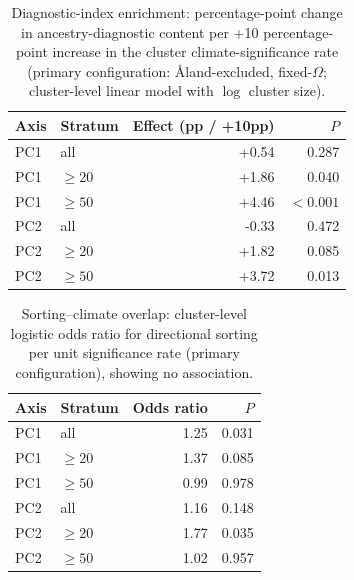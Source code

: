 \begin{table}[htbp]
\centering
\small
\caption{Diagnostic-index enrichment: percentage-point change in ancestry-diagnostic content per +10 percentage-point increase in the cluster climate-significance rate (primary configuration: {\AA}land-excluded, fixed-$\Omega$; cluster-level linear model with $\log$ cluster size).}
\label{tab:enrich}
\begin{tabular}{l l r r}
\toprule
Axis & Stratum & Effect (pp / +10pp) & $P$ \\
\midrule
PC1 & all & +0.54 & 0.287 \\
PC1 & $\geq20$ & +1.86 & 0.040 \\
PC1 & $\geq50$ & +4.46 & $<0.001$ \\
PC2 & all & -0.33 & 0.472 \\
PC2 & $\geq20$ & +1.82 & 0.085 \\
PC2 & $\geq50$ & +3.72 & 0.013 \\
\bottomrule
\end{tabular}
\end{table}

\begin{table}[htbp]
\centering
\small
\caption{Sorting--climate overlap: cluster-level logistic odds ratio for directional sorting per unit significance rate (primary configuration), showing no association.}
\label{tab:overlap}
\begin{tabular}{l l r r}
\toprule
Axis & Stratum & Odds ratio & $P$ \\
\midrule
PC1 & all & 1.25 & 0.031 \\
PC1 & $\geq20$ & 1.37 & 0.085 \\
PC1 & $\geq50$ & 0.99 & 0.978 \\
PC2 & all & 1.16 & 0.148 \\
PC2 & $\geq20$ & 1.77 & 0.035 \\
PC2 & $\geq50$ & 1.02 & 0.957 \\
\bottomrule
\end{tabular}
\end{table}
